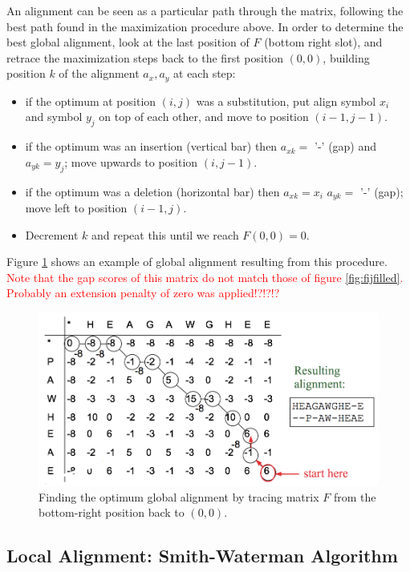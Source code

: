 An alignment can be seen as a particular path through the matrix, following the best path found in the maximization procedure above. In order to determine the best global alignment, look at the last position of $F$ (bottom right slot), and  retrace the maximization steps back to the first position $(0,0)$, building position $k$ of the alignment $a_x,a_y$ at each step:
\begin{itemize}
\item if the optimum at position $(i,j)$ was a substitution, put align symbol $x_i$ and symbol $y_j$ on top of each other, and move to position $(i-1, j-1)$.
\item if the optimum was an insertion (vertical bar) then $a_{xk}=$ '-' (gap) and $a_{yk}=y_j$; move upwards to position $(i, j-1)$.
\item if the optimum was a deletion (horizontal bar) then $a_{xk}=x_i$ $a_{yk}=$ '-' (gap); move left to position $(i-1, j)$.
\item Decrement $k$ and repeat this until we reach $F(0,0)=0$.
\end{itemize}

Figure \ref{fig:traceback} shows an example of global alignment resulting from this procedure.
\\
\textcolor{red}{Note that the gap scores of this matrix do not match those of figure \ref{fig:fijfilled}. Probably an extension penalty of zero was applied!?!?!?}

\begin{figure}[!htb]
\centerline{\includegraphics[width=.8\linewidth]{figs/traceback.png}}
\caption{Finding the optimum global alignment by tracing matrix $F$ from the bottom-right position back to $(0,0)$.}\label{fig:traceback}
\end{figure}

\subsection{Local Alignment: Smith-Waterman Algorithm}

